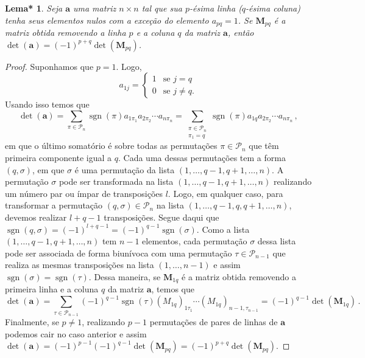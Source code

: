 \documentclass[12pt,a4paper]{report}
\newcommand{\mb}{\mathbf}
\newcommand{\mc}{\mathcal}
\newtheorem{lem*}[thm]{Lema*}
\DeclareMathOperator{\sgn}{sgn}
\begin{document}
\begin{lem*}
  \label{det.minor1}
  Seja $\mb a$ uma matriz $n\times n$ tal que sua $p$-ésima linha ($q$-ésima coluna) tenha seus elementos nulos com a exceção do elemento $a_{pq}=1$. Se $\mb M_{pq}$ é a matriz obtida removendo a linha $p$ e a coluna $q$ da matriz $\mb a$, então $\det(\mb a)=(-1)^{p+q}\det(\mb M_{pq})$.
\end{lem*}
\begin{proof}
  Suponhamos que $p=1$. Logo,
  $$a_{1j}=\begin{cases}
    1&\text{se $j=q$}\\
    0&\text{se $j\ne q$.}
  \end{cases}$$
  Usando isso temos que
  $$\det(\mb a)=\sum_{\pi\in\mc P_n}\sgn(\pi)a_{1\pi_1}a_{2\pi_2}\cdots a_{n\pi_n}=\sum_{\substack{\pi\in\mc P_n\\\pi_1=q}}\sgn(\pi)a_{1q}a_{2\pi_2}\cdots a_{n\pi_n}\,,$$
  em que o último somatório é sobre todas as permutações $\pi\in\mc P_n$ que têm primeira componente igual a $q$. Cada uma dessas permutações tem a forma $(q,\sigma)$, em que $\sigma$ é uma permutação da lista $(1,\ldots,q-1,q+1,\ldots,n)$.
  A permutação $\sigma$ pode ser transformada na lista $(1,\ldots,q-1,q+1,\ldots,n)$ realizando um número par ou ímpar de transposições $l$. Logo, em qualquer caso, para transformar a permutação $(q,\sigma)\in\mc P_n$ na lista $(1,\ldots,q-1,q,q+1,\ldots,n)$, devemos realizar $l+q-1$ transposições. Segue daqui que $\sgn(q,\sigma)=(-1)^{l+q-1}=(-1)^{q-1}\sgn(\sigma)$.
  Como a lista $(1,\ldots,q-1,q+1,\ldots,n)$ tem $n-1$ elementos, cada permutação $\sigma$ dessa lista pode ser associada de forma biunívoca com uma permutação $\tau\in\mc P_{n-1}$ que realiza as mesmas transposições na lista $(1,\ldots,n-1)$ e assim $\sgn(\sigma)=\sgn(\tau)$. Dessa maneira, se $\mb M_{1q}$ é a matriz obtida removendo a primeira linha e a coluna $q$ da matriz $\mb a$, temos que
  $$\det(\mb a)=\sum_{\tau\in\mc P_{n-1}}(-1)^{q-1}\sgn(\tau)(M_{1q})_{1\tau_1}\cdots (M_{1q})_{n-1,\tau_{n-1}}=(-1)^{q-1}\det(\mb M_{1q})\,.$$
  Finalmente, se $p\ne 1$, realizando $p-1$ permutações de pares de linhas de $\mb a$ podemos cair no caso anterior e assim $\det(\mb a)=(-1)^{p-1}(-1)^{q-1}\det(\mb M_{pq})=(-1)^{p+q}\det(\mb M_{pq})$.
\end{proof}
\end{document}
